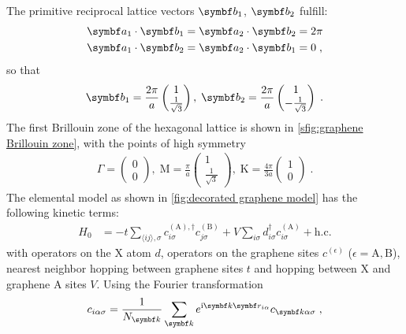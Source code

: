 \documentclass[../main.tex]{subfiles}
\begin{document}
The primitive reciprocal lattice vectors \(\vb{b}_1\), \(\vb{b}_2\) fulfill:
\begin{align}
	\vb{a}_1 \cdot \vb{b}_1 &= \vb{a}_2 \cdot \vb{b}_2 = 2\pi \\
	\vb{a}_1 \cdot \vb{b}_2 &= \vb{a}_2 \cdot \vb{b}_1 = 0\;,
\end{align}
so that
\begin{align}
	\vb{b}_1 = \frac{2\pi}{a} \begin{pmatrix} 1 \\ \frac{1}{\sqrt{3}} \end{pmatrix},\;
	\vb{b}_2 = \frac{2\pi}{a} \begin{pmatrix} 1 \\ - \frac{1}{\sqrt{3}} \end{pmatrix} \;.
\end{align}
The first Brillouin zone of the hexagonal lattice is shown in \cref{sfig:graphene Brillouin zone}, with the points of high symmetry
\begin{align}
	\Gamma = \begin{pmatrix} 0 \\ 0 \end{pmatrix},\;
	\mathrm{M} = \frac{\pi}{a} \begin{pmatrix} 1 \\ \frac{1}{\sqrt{3}} \end{pmatrix},\;
	\mathrm{K} = \frac{4\pi}{3 a} \begin{pmatrix} 1 \\ 0 \end{pmatrix}\;.
\end{align}
The elemental model as shown in \cref{fig:decorated graphene model} has the following kinetic terms:
\begin{align}
	H_0 &= -t \sum_{\langle ij \rangle, \sigma}
	c_{i \sigma}^{(\mathrm{A}), \dagger} c_{j \sigma}^{(\mathrm{B})}
	+ V \sum_{i \sigma}
	d_{i \sigma}^{\dagger} c_{i \sigma}^{(\mathrm{A})} + \mathrm{h.c.}
	\label{eq:EG-X model Hamiltonian non-interacting}
\end{align}
with operators on the X atom \(d\), operators on the graphene sites \(c^{(\epsilon)}\) (\(\epsilon = \mathrm{A}, \mathrm{B}\)), nearest neighbor hopping between graphene sites \(t\) and hopping between \(\mathrm{X}\) and graphene \(\mathrm{A}\) sites \(V\).
Using the Fourier transformation
\begin{equation}
	c_{i \alpha \sigma} = \frac{1}{N_{\vb{k}}} \sum_{\vb{k}} e^{\iu \vb{k} \vb{r}_{i \alpha}} c_{\vb{k} \alpha \sigma} \;,
\end{equation}
\end{document}
